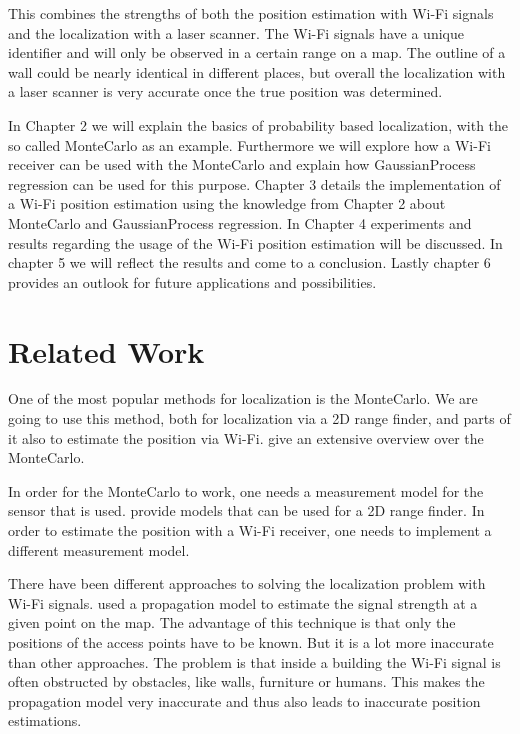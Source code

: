This combines the strengths of both the position estimation with Wi-Fi signals and the localization with a laser scanner. The Wi-Fi signals have a unique identifier and will only be observed in a certain range on a map. The outline of a wall could be nearly identical in different places, but overall the localization with a laser scanner is very accurate once the true position was determined. 

In Chapter 2 we will explain the basics of probability based localization, with the so called \Gls{MonteCarlo}\citep{Dellaert_1999_533} as an example. 
Furthermore we will explore how a Wi-Fi receiver can be used with the \Gls{MonteCarlo} and explain how \Gls{GaussianProcess}\citep{Rasmussen:2005:GPM:1162254} regression can be used for this purpose.
Chapter 3 details the implementation of a Wi-Fi position estimation using the knowledge from Chapter 2 about \Gls{MonteCarlo} and \Gls{GaussianProcess} regression.
In Chapter 4 experiments and results regarding the usage of the Wi-Fi position estimation will be discussed.
In chapter 5 we will reflect the results and come to a conclusion. 
Lastly chapter 6 provides an outlook for future applications and possibilities.

\section{Related Work}
One of the most popular methods for localization is the \Gls{MonteCarlo}. We are going to use this method, both for localization via a 2D range finder, and parts of it also to estimate the position via Wi-Fi. \citet{Thrun:2005:PR:1121596} give an extensive overview over the \Gls{MonteCarlo}.

In order for the \Gls{MonteCarlo} to work, one needs a measurement model for the sensor that is used. \citet{Thrun:2005:PR:1121596} provide models that can be used for a 2D range finder. In order to estimate the position with a Wi-Fi receiver, one needs to implement a different measurement model.

There have been different approaches to solving the localization problem with Wi-Fi signals. \citet{serrano2012robot} used a propagation model to estimate the signal strength at a given point on the map. The advantage of this technique is that only the positions of the access points have to be known. But it is a lot more inaccurate than other approaches. The problem is that inside a building the Wi-Fi signal is often obstructed by obstacles, like walls, furniture or humans.  This makes the propagation model very inaccurate and thus also leads to inaccurate position estimations.

